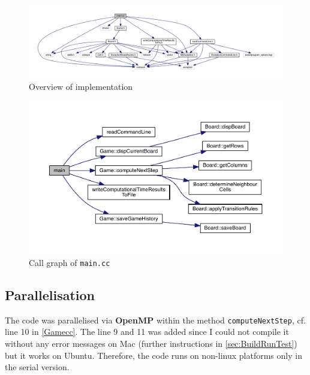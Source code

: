 \begin{figure}
	\includegraphics[width=\textwidth]{doxygen/latex/a00143.pdf}
	\caption{Overview of implementation}
	\label{fig:OverviewOfImplementation}
\end{figure}


\begin{figure}
	\includegraphics[width=\textwidth]{doxygen/latex/a00108_a3c04138a5bfe5d72780bb7e82a18e627_cgraph.pdf}
	\caption{Call graph of \texttt{main.cc}}
	\label{fig:computeNextStepCall}
\end{figure}

%

\subsection{Parallelisation}
The code was parallelised via \textbf{OpenMP} within the method \texttt{computeNextStep}, cf. line 10 in \cref{Gamecc}. The line 9 and 11 was added since I could not compile it without any error messages on Mac (further instructions in \cref{sec:BuildRunTest}) but it works on Ubuntu. Therefore, the code runs on non-linux platforms only in the serial version.


